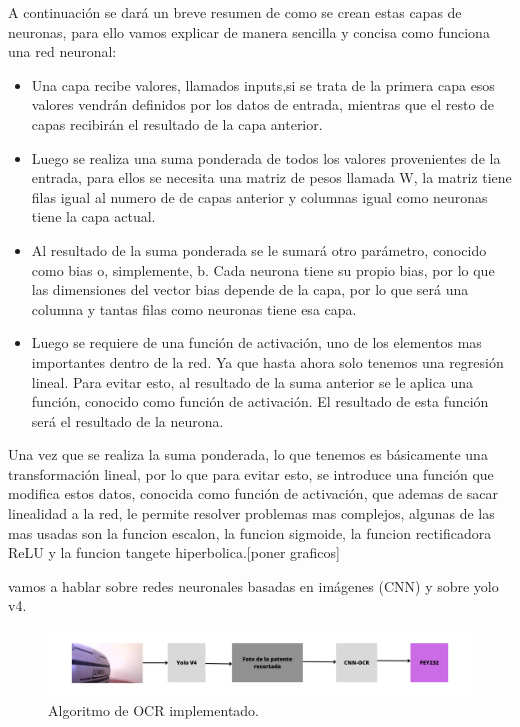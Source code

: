 A continuación se dará un breve resumen de como se crean estas capas de neuronas, para ello vamos explicar de manera sencilla y concisa como funciona una red neuronal:
\begin{itemize}
    \item Una capa recibe valores, llamados inputs,si se trata de la primera capa esos valores vendrán definidos por los datos de entrada, mientras que el resto de capas recibirán el resultado de la capa anterior.
    \item Luego se realiza una suma ponderada de todos los valores provenientes de la entrada, para ellos se necesita una matriz de pesos llamada W, la matriz tiene filas igual al numero de de capas anterior y columnas igual como neuronas tiene la capa actual.
    \item Al resultado de la suma ponderada se le sumará otro parámetro, conocido como bias o, simplemente, b. Cada neurona tiene su propio bias, por lo que las dimensiones del vector bias depende de la capa, por lo que será una columna y tantas filas como neuronas tiene esa capa.
    \item Luego se requiere de una función de activación, uno de los elementos mas importantes dentro de la red. Ya que hasta ahora solo tenemos una regresión lineal. Para evitar esto, al resultado de la suma anterior se le aplica una función, conocido como función de activación. El resultado de esta función será el resultado de la neurona.
\end{itemize}

Una vez que se realiza la suma ponderada, lo que tenemos es básicamente una transformación lineal, por lo que para evitar esto, se introduce una función que modifica estos datos, conocida como función de activación, que ademas de sacar linealidad a la red, le permite resolver problemas mas complejos, algunas de las mas usadas son la funcion escalon, la funcion sigmoide, la funcion rectificadora ReLU y la funcion tangete hiperbolica.[poner graficos]


vamos a hablar sobre redes neuronales basadas en imágenes (CNN) y sobre yolo v4.

\begin{figure}
    \centering
    \includegraphics[width=\textwidth]{imgs/algoritmo-deteccion-patente.png}
    \caption{Algoritmo de OCR implementado.}
\end{figure}


